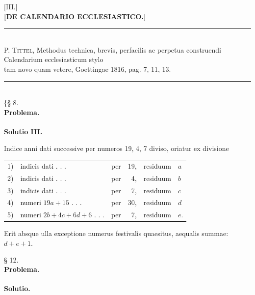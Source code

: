 \clearpage\begingroup\NoSourceHead{}
\newcommand{\ChronMoon}{\mathord{\vcenter{\hbox{\begin{tikzpicture}[x=1ex,y=1ex]
\path[use as bounding box] (0,0) rectangle (.65,1.1);
\path[fill=black] (.6,1.1) .. controls (-.1,1.05) and (-.1,.05) .. (.6,0)
.. controls (.13,.2) and (.13,.9) .. (.6,1.1) -- cycle;
\end{tikzpicture}}}}}
\begin{center}
{[III.]}\\[.8em]
\textbf{[DE CALENDARIO ECCLESIASTICO.]}\\[.7em]
\rule{\textwidth}{.35pt}\\[.2em]
{\small P. \textsc{Tittel}, Methodus technica, brevis, perfacilis ac perpetua construendi Calendarium ecclesiasticum stylo\\
tam novo quam vetere, Goettingae 1816, pag. 7, 11, 13.}\\[.2em]
\rule{\textwidth}{.35pt}\\[1em]
\{§ 8.\\[.7em]
\textbf{Problema.}\\[.7em]
\\[.7em]
\textbf{Solutio III.}
\end{center}
\noindent\hspace*{\parindent}Indice anni dati successive per numeros 19, 4, 7 diviso, oriatur ex divisione
\begin{center}
\begin{tabular}{@{}r l l r l l@{}}
1)&indicis dati . . .&per&19,&residuum&$a$\\
2)&indicis dati . . .&per&4,&residuum&$b$\\
3)&indicis dati . . .&per&7,&residuum&$c$\\
4)&numeri $19a+15$ . . .&per&30,&residuum&$d$\\
5)&numeri $2b+4c+6d+6$ . . .&per&7,&residuum&$e$.
\end{tabular}
\end{center}
\noindent\hspace*{\parindent}Erit absque ulla exceptione numerus festivalis quaesitus, aequalis summae: $d+e+1$.
\begin{center}
§ 12.\\[.7em]
\textbf{Problema.}\\[.7em]
\\[.7em]
\textbf{Solutio.}
\end{center}
